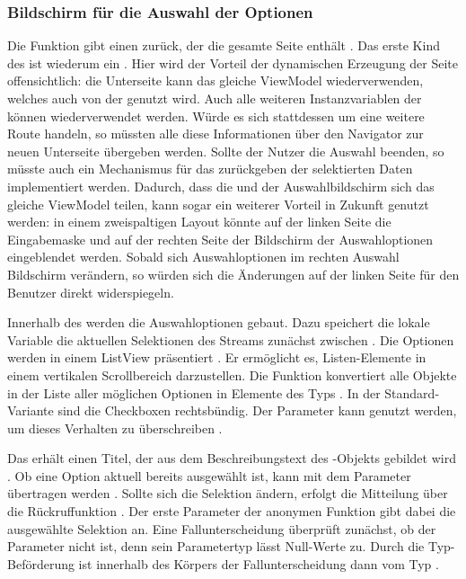 \subsubsection{Bildschirm für die Auswahl der Optionen}

 
Die Funktion  \Lst{\ref{lst:Schritt1FunktionCreateMultipleChoiceSelectionScreen}} gibt einen  zurück, der die gesamte Seite enthält .
Das erste Kind des  ist wiederum ein  .
Hier wird der Vorteil der dynamischen Erzeugung der Seite offensichtlich: die Unterseite kann das gleiche ViewModel wiederverwenden, welches auch von der  genutzt wird.  Auch alle weiteren Instanzvariablen der  können wiederverwendet werden. Würde es sich stattdessen um eine weitere Route handeln, so müssten alle diese Informationen über den Navigator zur neuen Unterseite übergeben werden. Sollte der Nutzer die Auswahl beenden, so müsste auch ein Mechanismus für das zurückgeben der selektierten Daten implementiert werden.
Dadurch, dass die  und der Auswahlbildschirm sich das gleiche ViewModel teilen, kann sogar ein weiterer Vorteil in Zukunft genutzt werden: in einem zweispaltigen Layout könnte auf der linken Seite die Eingabemaske und auf der rechten Seite der Bildschirm der Auswahloptionen eingeblendet werden.
Sobald sich Auswahloptionen im rechten Auswahl Bildschirm verändern, so würden sich die Änderungen auf der linken Seite für den Benutzer direkt widerspiegeln.

Innerhalb des  werden die Auswahloptionen gebaut.
Dazu speichert die lokale Variable  die aktuellen Selektionen des Streams zunächst zwischen .
Die Optionen werden in einem ListView präsentiert .
Er ermöglicht es, Listen-Elemente in einem vertikalen Scrollbereich darzustellen.
Die Funktion  konvertiert alle Objekte in der Liste aller möglichen Optionen  in Elemente des Typs  .
In der Standard-Variante sind die Checkboxen rechtsbündig.
Der Parameter  kann genutzt werden, um dieses Verhalten zu überschreiben . 

Das  erhält einen Titel, der aus dem Beschreibungstext  des -Objekts gebildet wird .
Ob eine Option aktuell bereits ausgewählt ist, kann mit dem Parameter  übertragen werden .
Sollte sich die Selektion ändern, erfolgt die Mitteilung über die Rückruffunktion  .
Der erste Parameter der anonymen Funktion gibt dabei die ausgewählte Selektion an.
Eine Fallunterscheidung überprüft zunächst, ob der Parameter  nicht  ist, denn sein Parametertyp  lässt Null-Werte zu.
Durch die Typ-Beförderung ist  innerhalb des Körpers der Fallunterscheidung dann vom Typ  . 


